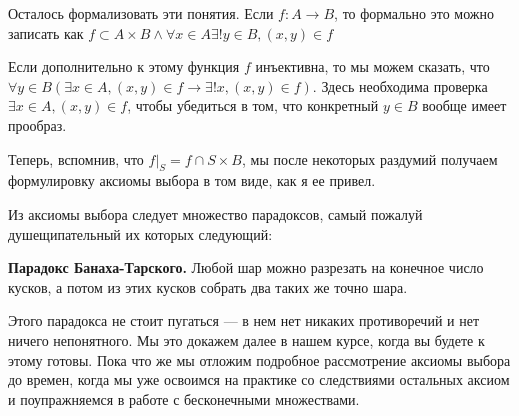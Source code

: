 Осталось формализовать эти понятия. Если $f: A\to B$, то формально это можно записать как $f\subset A\times B \wedge \forall x \in A \exists!y\in B, (x, y)\in f$

Если дополнительно к этому функция $f$ инъективна, то мы можем сказать, что $\forall y\in B (\exists x\in A, (x, y)\in f \rightarrow \exists!x, (x, y)\in f)$. Здесь необходима проверка $\exists x\in A, (x, y)\in f$, чтобы убедиться в том, что конкретный $y\in B$ вообще имеет прообраз.

Теперь, вспомнив, что $f|_S = f\cap S\times B$, мы после некоторых раздумий получаем формулировку аксиомы выбора в том виде, как я ее привел.

Из аксиомы выбора следует множество парадоксов, самый пожалуй душещипательный их которых следующий:

{\bfseries Парадокс Банаха-Тарского.} Любой шар можно разрезать на конечное число кусков, а потом из этих кусков собрать два таких же точно шара.

Этого парадокса не стоит пугаться — в нем нет никаких противоречий и нет ничего непонятного. Мы это докажем далее в нашем курсе, когда вы будете к этому готовы. Пока что же мы отложим подробное рассмотрение аксиомы выбора до времен, когда мы уже освоимся на практике со следствиями остальных аксиом и поупражняемся в работе с бесконечными множествами.
